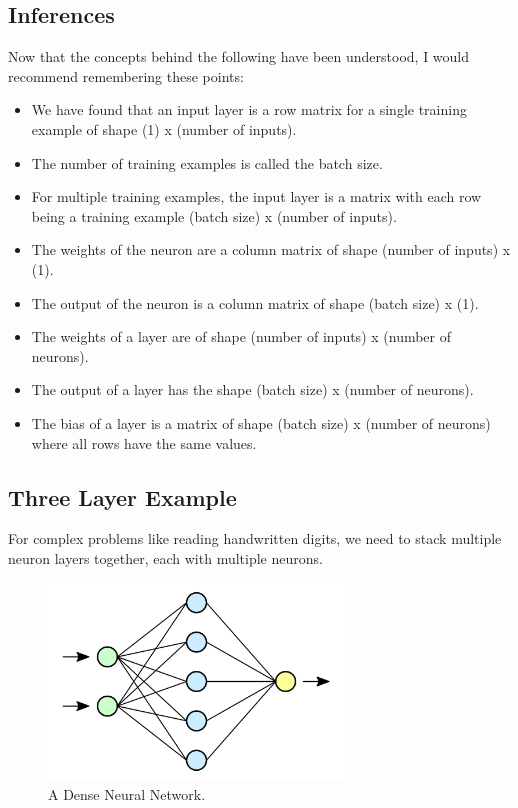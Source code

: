 \documentclass[12pt,a4paper]{article}
\begin{document}
\subsection{Inferences}
Now that the concepts behind the following have been understood, I would recommend remembering these points:
\begin{itemize}
    \item We have found that an input layer is a row matrix for a single training example of shape (1) x (number of inputs).
    \item The number of training examples is called the batch size.
    \item For multiple training examples, the input layer is a matrix with each row being a training example (batch size) x (number of inputs).
    \item The weights of the neuron are a column matrix of shape (number of inputs) x (1).
    \item The output of the neuron is a column matrix of shape (batch size) x (1).
    \item The weights of a layer are of shape (number of inputs) x (number of neurons).
    \item The output of a layer has the shape (batch size) x (number of neurons).  
    \item The bias of a layer is a matrix of shape (batch size) x (number of neurons) where all rows have the same values.
\end{itemize}
\newpage

\subsection{Three Layer Example}
For complex problems like reading handwritten digits, we need to stack multiple neuron layers together, each with multiple neurons. 
\begin{figure}[ht]
    \centering
    \includegraphics[width=0.7\textwidth]{../figs/Neural_network.svg.png}
    \caption{A Dense Neural Network.}
    \label{fig:DNN}
\end{figure}
\end{document}
